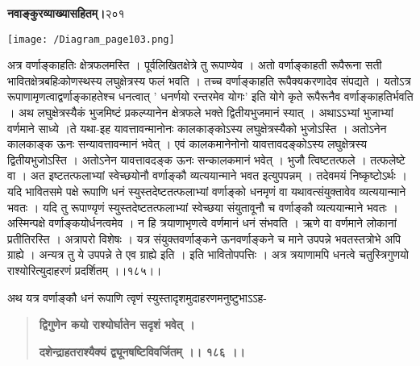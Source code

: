 \documentclass[11pt, openany]{book}
\begin{document}
\onehalfspacing
\hspace{2in}\textbf{नवाङ्कुरव्याख्यासहितम्।}\hspace{2in}२०१ 

\vspace{5mm}

\begin{sloppypar}
\begin{center}
\hspace{0.2in}\texttt{[image: /Diagram\_page103.png]}
\end{center}

\hangindent=0.2in \hspace{0.2in}अत्र वर्णाङ्काहतिः क्षेत्रफलमस्ति । पूर्वलिखितक्षेत्रे तु रूपाण्येव । अतो वर्णाङ्काहती रूपैरूना सती भावितक्षेत्रबहिःकोणस्थस्य लघुक्षेत्रस्य फलं भवति । तच्च वर्णाङ्काहति रूपैक्यकरणादेव संपद्यते । यतोऽत्र रूपाणामृणत्वाद्वर्णाङ्काहतेश्च धनत्वात् ' धनर्णयो रन्तरमेव योगः' इति योगे कृते रूपैरूनैव वर्णाङ्काहतिर्भवति । अथ लघुक्षेत्रस्यैकं भुजमिष्टं प्रकल्प्यानेन क्षेत्रफले भक्ते द्वितीयभुजमानं स्यात् । अथाऽऽभ्यां भुजाभ्यां वर्णमाने साध्ये ।ते यथा-इह यावत्तावन्मानोनः कालकाङ्कोऽस्य लघुक्षेत्रस्यैको भुजोऽस्ति । अतोऽनेन कालकाङ्क ऊनः सन्यावत्तावन्मानं भवेत् । एवं कालकमानेनोनो यावत्तावदङ्कोऽस्य लघुक्षेत्रस्य द्वितीयभुजोऽस्ति । अतोऽनेन यावत्तावदङ्क ऊनः सन्कालकमानं भवेत् । भुजौ त्विष्टतत्फले । तत्फलेष्टे वा । अत इष्टतत्फलाभ्यां स्वेच्छयोनौ वर्णाङ्कौ व्यत्ययान्माने भवत इत्युपपन्नम् । तदेवमयं निष्कृष्टोऽर्थः । यदि भावितसमे पक्षे रूपाणि धनं स्युस्तदेष्टतत्फलाभ्यां वर्णाङ्को धनमृणं वा यथावत्संयुक्तावेव व्यत्ययान्माने भवतः । यदि तु रूपाण्यृणं स्युस्तदेष्टतत्फलाभ्यां स्वेच्छया संयुतावूनौ च वर्णाङ्कौ व्यत्ययान्माने भवतः । अस्मिन्पक्षे वर्णाङ्कयोर्धनत्वमेव । न हि त्रयाणाभृणत्वे वर्णमानं धनं संभवति । ऋणे वा वर्णमाने लोकानां प्रतीतिरस्ति । अत्रापरो विशेषः । यत्र संयुक्तवर्णाङ्कने ऊनवर्णाङ्कने च माने उपपन्ने भवतस्तत्रोभे अपि ग्राह्ये । अन्यत्र तु ये उपपन्ने ते एव ग्राह्ये इति । इति भावितोपपत्तिः । अत्र त्रयाणामपि धनत्वे चतुस्त्रिगुणयो राश्योरित्युदाहरणं प्रदर्शितम् ।।१८५।।

\hangindent=0.2in \hspace{0.2in}अथ यत्र वर्णाङ्कौ धनं रूपाणि त्वृणं स्युस्तादृशमुदाहरणमनुष्टुभाऽऽह- 

\begin{quote}
\hspace{0.5in}\textbf{द्विगुणेन कयो राश्योर्घातेन सदृशं भवेत् ।}

\hspace{0.5in}\textbf{दशेन्द्राहतराश्यैक्यं द्व्यूनषष्टिविवर्जितम् ।। १८६ ।।}
\end{quote}


\end{sloppypar}
\end{document}
